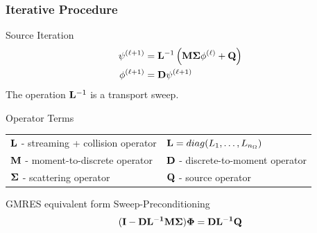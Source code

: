 \documentclass[compress,10pt]{beamer}
\begin{document}
\typeout{***********************************************************************************}
\begin{frame}[t]\frametitle{Iterative Procedure}

\begin{block}{Source Iteration} {\small
\begin{equation*}
\begin{aligned}
 \psi^{(\ell+1)} &= {\bf L}^{-1} \left( {\bf M} {\bf \Sigma} \phi^{(\ell)}  +  {\bf Q} \right) \\
\phi^{(\ell+1)} &= {\bf D}  \psi^{(\ell+1)}
\end{aligned}
\end{equation*}
The operation ${\bf L}^{-1}$ is a transport sweep.\\
}
\end{block}

\begin{block}{Operator Terms} {\small
\begin{tabular}{ll}
${\bf L}$ - streaming + collision operator & ${\bf L } = diag(L_1, \ldots, L_{n_\Omega})$ \\
${\bf M}$ - moment-to-discrete operator &
${\bf D}$ - discrete-to-moment operator \\
${\bf \Sigma}$ - scattering operator &
${\bf Q}$ - source operator \\
\end{tabular}
}
\end{block}

\begin{block}{GMRES equivalent form} {\small
Sweep-Preconditioning
\[
{\bf  ( I - DL^{-1} M\Sigma) \Phi = D L^{-1} Q}
\]
}
\end{block}
\end{frame}
\typeout{***********************************************************************************}
\end{document}
